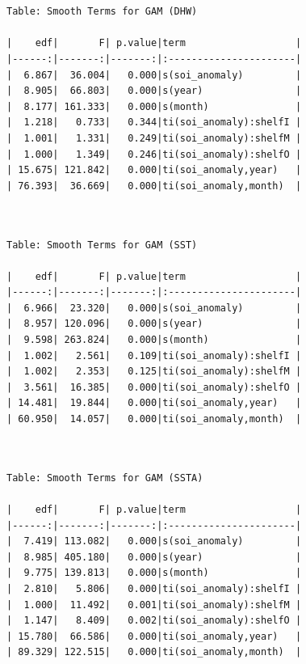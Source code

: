 \documentclass[letterpaper,9pt,twocolumn,twoside,]{pinp}
\begin{document}
\begin{ShadedResult}
\begin{verbatim}


Table: Smooth Terms for GAM (DHW)

|    edf|       F| p.value|term                   |
|------:|-------:|-------:|:----------------------|
|  6.867|  36.004|   0.000|s(soi_anomaly)         |
|  8.905|  66.803|   0.000|s(year)                |
|  8.177| 161.333|   0.000|s(month)               |
|  1.218|   0.733|   0.344|ti(soi_anomaly):shelfI |
|  1.001|   1.331|   0.249|ti(soi_anomaly):shelfM |
|  1.000|   1.349|   0.246|ti(soi_anomaly):shelfO |
| 15.675| 121.842|   0.000|ti(soi_anomaly,year)   |
| 76.393|  36.669|   0.000|ti(soi_anomaly,month)  |

\end{verbatim}
\end{ShadedResult}

\begin{ShadedResult}
\begin{verbatim}


Table: Smooth Terms for GAM (SST)

|    edf|       F| p.value|term                   |
|------:|-------:|-------:|:----------------------|
|  6.966|  23.320|   0.000|s(soi_anomaly)         |
|  8.957| 120.096|   0.000|s(year)                |
|  9.598| 263.824|   0.000|s(month)               |
|  1.002|   2.561|   0.109|ti(soi_anomaly):shelfI |
|  1.002|   2.353|   0.125|ti(soi_anomaly):shelfM |
|  3.561|  16.385|   0.000|ti(soi_anomaly):shelfO |
| 14.481|  19.844|   0.000|ti(soi_anomaly,year)   |
| 60.950|  14.057|   0.000|ti(soi_anomaly,month)  |

\end{verbatim}
\end{ShadedResult}

\begin{ShadedResult}
\begin{verbatim}


Table: Smooth Terms for GAM (SSTA)

|    edf|       F| p.value|term                   |
|------:|-------:|-------:|:----------------------|
|  7.419| 113.082|   0.000|s(soi_anomaly)         |
|  8.985| 405.180|   0.000|s(year)                |
|  9.775| 139.813|   0.000|s(month)               |
|  2.810|   5.806|   0.000|ti(soi_anomaly):shelfI |
|  1.000|  11.492|   0.001|ti(soi_anomaly):shelfM |
|  1.147|   8.409|   0.002|ti(soi_anomaly):shelfO |
| 15.780|  66.586|   0.000|ti(soi_anomaly,year)   |
| 89.329| 122.515|   0.000|ti(soi_anomaly,month)  |

\end{verbatim}
\end{ShadedResult}
\end{document}
